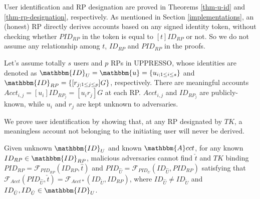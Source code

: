 
User identification and RP designation are proved in Theorems \ref{thm-u-id} and \ref{thm-rp-designation}, respectively.
As mentioned in Section \ref{implementations}, an (honest) RP directly derives accounts based on any signed identity token, without checking whether $PID_{RP}$ in the token is equal to $[t]ID_{RP}$ or not.
So we do not assume any relationship among $t$, $ID_{RP}$ and $PID_{RP}$ in the proofs.

Let's assume totally $s$ users and $p$ RPs in UPPRESSO,
    whose identities are denoted as $\mathbbm{ID}_U = \mathbbm{u} = \{u_{i; 1 \leq i \leq s}\}$ and $\mathbbm{ID}_{RP} = \{[r_{j;1 \leq j \leq p}]G\}$, respectively.
There are meaningful accounts $Acct_{i,j}=[u_i]ID_{RP_j} = [u_i r_j]G$ at each RP.
$Acct_{i,j}$ and $ID_{RP_j}$ are publicly-known, while $u_{i}$ and $r_{j}$ are kept unknown to adversaries.



We prove user identification by showing that,
    at any RP designated by $TK$,
        a meaningless account not belonging to the initiating user will never be derived.

\vspace{1.5mm}
\begin{thm} Given unknown $\mathbbm{ID}_U$ and known $\mathbbm{A}cct$,
for any known $ID_{RP} \in \mathbbm{ID}_{RP}$, 
     malicious adversaries cannot find $\check{t}$ and $TK$ binding $PID_{RP} = \mathcal{F}_{PID_{RP}}(ID_{RP}, \hat{t})$
     and $PID_{\hat{U}}=\mathcal{F}_{PID_U}(ID_{\hat{U}}, PID_{RP})$ satisfying that $\mathcal{F}_{Acct}(PID_{\hat{U}}, \check{t}) = \mathcal{F}_{Acct\ast}(ID_{\check{U}}, ID_{RP})$, where $ID_{\hat{U}} \neq ID_{\check{U}}$ and $ID_{\hat{U}},ID_{\check{U}} \in \mathbbm{ID}_U$.
\label{thm-u-id}
\end{thm}

